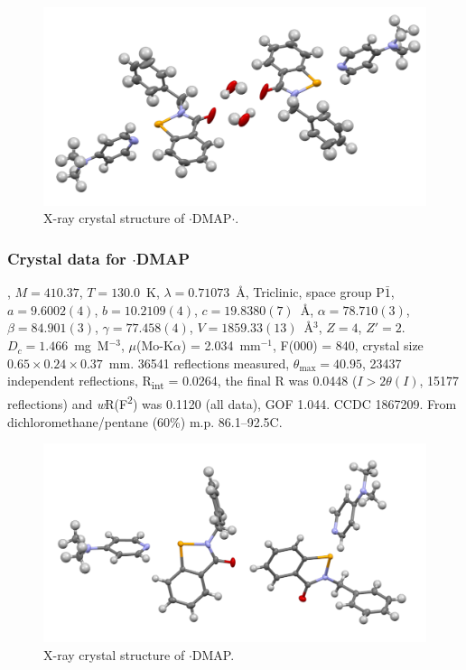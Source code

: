 \begin{refsection}
\begin{figure}
  \includegraphics[width=0.6\linewidth]{Figures/ebs-bn-dmap-hydrate-xtal.pdf}
  \caption{X-ray crystal structure of \texorpdfstring{$ \cdot $DMAP$ \cdot $}{C21H21N3OSe.(H2O)}.}
\end{figure}

\subsubsection{Crystal data for \texorpdfstring{$ \cdot $DMAP}{C21H21N3OSe}}
, $M=410.37$, $T=130.0$~K, $ \lambda=0.71073 $~\AA, Triclinic, space group P$\bar{1}$, $a = 9.6002(4)$, $b = 10.2109(4)$, $c = 19.8380(7)$~\AA, $\alpha = 78.710(3)$\degree, $\beta = 84.901(3)$\degree, $\gamma = 77.458(4)$\degree, $V = 1859.33(13)$~\AA$^{3}$, $Z = 4$, $Z\prime = 2$.
$D_{c}= 1.466$~mg~M$^{-3}$, $\mu$(Mo-K$\alpha$) = 2.034~mm$^{-1}$, F(000) = 840, crystal size $0.65 \times 0.24 \times 0.37$~mm.
36541 reflections measured, $\theta_{\max} = 40.95$\degree, 23437 independent reflections, R\textsubscript{int} = 0.0264, the final R was 0.0448 ($I > 2\theta(I)$, 15177 reflections) and \textit{w}R(F\textsuperscript{2}) was 0.1120 (all data), GOF 1.044.
CCDC 1867209.
From dichloromethane/pentane (60\%) m.p. 86.1--92.5\degree{}C.

\begin{figure}
  \includegraphics[width=0.6\linewidth]{Figures/ebs-bn-dmap-xtal.pdf}
  \caption{X-ray crystal structure of \texorpdfstring{$ \cdot $DMAP}{C21H21N3OSe}.}
\end{figure}


\end{refsection}
